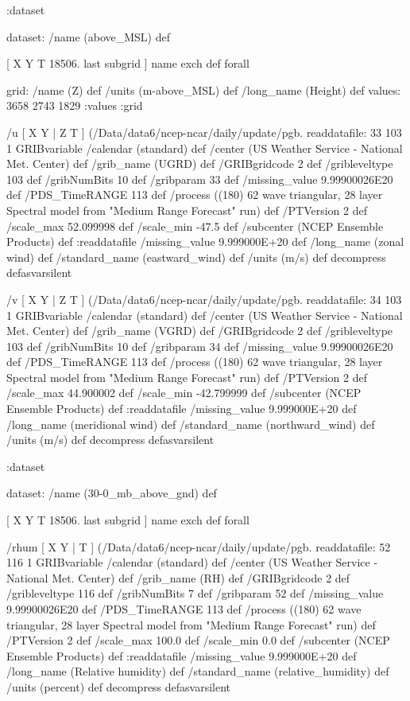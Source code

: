 \begin{ingrid}
 :dataset
 
 dataset: /name (above_MSL) def 

  [ X Y T 18506. last subgrid ] { name exch def } forall

  grid:
  /name (Z) def
  /units (m-above_MSL) def
  /long_name (Height) def
  values: 3658 2743 1829 :values 
  :grid

  /u { [ X Y | Z T ] (/Data/data6/ncep-ncar/daily/update/pgb.%
  readdatafile:
  33 103 1 GRIBvariable
  /calendar (standard) def
  /center (US Weather Service - National Met. Center) def
  /grib_name (UGRD) def
  /GRIBgridcode 2 def
  /gribleveltype 103 def
  /gribNumBits 10 def
  /gribparam 33 def
  /missing_value 9.99900026E20 def
  /PDS_TimeRANGE 113 def
  /process ((180) 62 wave triangular, 28 layer Spectral model from "Medium Range Forecast" run) def
  /PTVersion 2 def
  /scale_max 52.099998 def
  /scale_min -47.5 def
  /subcenter (NCEP Ensemble Products) def
  :readdatafile
  /missing_value 9.999000E+20 def
  /long_name (zonal wind) def
  /standard_name (eastward_wind) def
  /units (m/s) def
  decompress
  } defasvarsilent

  /v { [ X Y | Z T ] (/Data/data6/ncep-ncar/daily/update/pgb.%
  readdatafile:
  34 103 1 GRIBvariable
  /calendar (standard) def
  /center (US Weather Service - National Met. Center) def
  /grib_name (VGRD) def
  /GRIBgridcode 2 def
  /gribleveltype 103 def
  /gribNumBits 10 def
  /gribparam 34 def
  /missing_value 9.99900026E20 def
  /PDS_TimeRANGE 113 def
  /process ((180) 62 wave triangular, 28 layer Spectral model from "Medium Range Forecast" run) def
  /PTVersion 2 def
  /scale_max 44.900002 def
  /scale_min -42.799999 def
  /subcenter (NCEP Ensemble Products) def
  :readdatafile
  /missing_value 9.999000E+20 def
  /long_name (meridional wind) def
  /standard_name (northward_wind) def
  /units (m/s) def
  decompress
  } defasvarsilent

 :dataset

 dataset: /name (30-0_mb_above_gnd) def 

  [ X Y T 18506. last subgrid ] { name exch def } forall

  /rhum { [ X Y | T ] (/Data/data6/ncep-ncar/daily/update/pgb.%
  readdatafile:
  52 116 1 GRIBvariable
  /calendar (standard) def
  /center (US Weather Service - National Met. Center) def
  /grib_name (RH) def
  /GRIBgridcode 2 def
  /gribleveltype 116 def
  /gribNumBits 7 def
  /gribparam 52 def
  /missing_value 9.99900026E20 def
  /PDS_TimeRANGE 113 def
  /process ((180) 62 wave triangular, 28 layer Spectral model from "Medium Range Forecast" run) def
  /PTVersion 2 def
  /scale_max 100.0 def
  /scale_min 0.0 def
  /subcenter (NCEP Ensemble Products) def
  :readdatafile
  /missing_value 9.999000E+20 def
  /long_name (Relative humidity) def
  /standard_name (relative_humidity) def
  /units (percent) def
  decompress
  } defasvarsilent


\end{ingrid}
